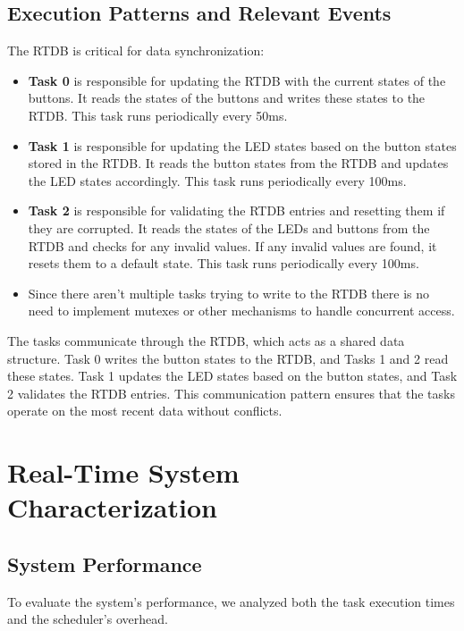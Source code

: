 \documentclass[a4paper,12pt]{article}
\begin{document}
\subsection{Execution Patterns and Relevant Events}
The RTDB is critical for data synchronization:
\begin{itemize}
    \item \textbf{Task 0} is responsible for updating the RTDB with the current states of the buttons. It reads the states of the buttons and writes these states to the RTDB. This task runs periodically every 50ms.
    \item \textbf{Task 1} is responsible for updating the LED states based on the button states stored in the RTDB. It reads the button states from the RTDB and updates the LED states accordingly. This task runs periodically every 100ms.
    \item \textbf{Task 2} is responsible for validating the RTDB entries and resetting them if they are corrupted. It reads the states of the LEDs and buttons from the RTDB and checks for any invalid values. If any invalid values are found, it resets them to a default state. This task runs periodically every 100ms.

    \item Since there aren't multiple tasks trying to write to the RTDB there is no need to implement mutexes or other mechanisms to handle concurrent access.
\end{itemize}


The tasks communicate through the RTDB, which acts as a shared data structure. Task 0 writes the button states to the RTDB, and Tasks 1 and 2 read these states. Task 1 updates the LED states based on the button states, and Task 2 validates the RTDB entries. This communication pattern ensures that the tasks operate on the most recent data without conflicts.

\section{Real-Time System Characterization}
\subsection{System Performance}
To evaluate the system's performance, we analyzed both the task execution times and the scheduler's overhead.
\end{document}
